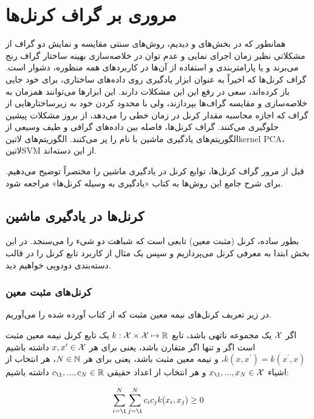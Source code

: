 \section{مروری بر گراف کرنل‌ها}
همانطور که در بخش‌های  و  دیدیم، روش‌های سنتی مقایسه و نمایش دو گراف از مشکلاتی نظیر زمان اجرای نمایی و عدم توان در خلاصه‌سازی بهینه ساختار گراف رنج می‌برند و یا پارامتربندی و استفاده از آن‌ها در کاربردهای همه منظوره، دشوار است. گراف کرنل‌ها که اخیراً به عنوان ابزار یادگیری روی داده‌های ساختاری، برای خود جایی باز کرده‌اند، سعی در رفع این این مشکلات دارند. این ابزارها می‌توانند همزمان به خلاصه‌سازی و مقایسه گراف‌ها بپردازند، ولی با محدود کردن خود به زیرساختارهایی از گراف که اجازه محاسبه مقدار کرنل در زمان خطی را می‌دهد، از بروز مشکلات پیشین جلوگیری می‌کنند. گراف کرنل‌ها، فاصله بین داده‌های گرافی و طیف وسیعی از الگوریتم‌های یادگیری ماشین با نام  را پر می‌کنند. الگوریتم‌های ‌لاتین{kernel PCA}، ‌لاتین{SVM} از این دسته‌اند.

قبل از مرور گراف کرنل‌ها، توابع کرنل در یادگیری ماشین را مختصراً توضیح می‌دهیم. برای شرح جامع این روش‌ها به کتاب «یادگیری به وسیله کرنل‌ها» مراجعه شود.

\subsection{کرنل‌ها در یادگیری ماشین}
بطور ساده، کرنل (مثبت معین) تابعی است که شباهت دو شیء را می‌سنجد. در این بخش ابتدا به معرفی کرنل می‌پردازیم و سپس یک مثال از کاربرد تابع کرنل را در قالب دسته‌بندی دودویی خواهیم دید.

\subsubsection{کرنل‌های مثبت معین}\label{sec:positive-semidefinite-kernels}
در زیر تعریف کرنل‌های نیمه معین مثبت که از کتاب  آورده شده را می‌آوریم.
\begin{definition}
اگر $\mathcal{X}$ یک مجموعه ناتهی باشد، تابع $k: \mathcal{X} \times \mathcal{X} \mapsto \mathbb{R}$ یک تابع کرنل نیمه معین مثبت است اگر و تنها اگر متقارن باشد، یعنی برای هر $x,x^\prime \in \mathcal{X}$ داشته باشیم
$k(x,x^\prime) = k(x^\prime,x)$، و نیمه معین مثبت باشد، 
یعنی برای هر $N \in \mathbb{N}$، هر انتخاب از اشیاء $x_\1,...,x_N \in \mX$ و هر انتخاب از اعداد حقیقی $c_\1,...,c_N \in \R$ داشته باشیم:

\begin{equation*}
\sum_{i=\1}^{N}\sum_{j=\1}^{N}c_ic_jk(x_i,x_j) \geq 0
\end{equation*}
\end{definition}

